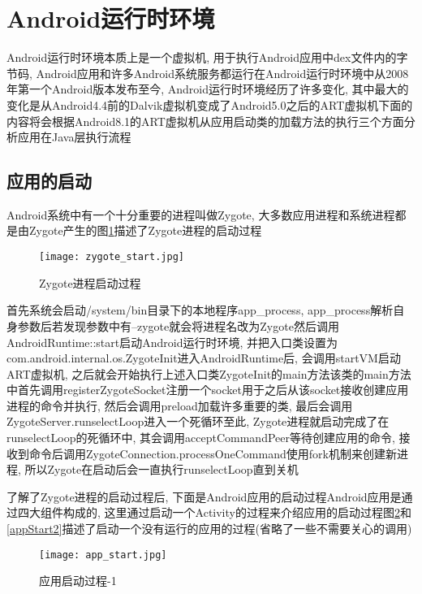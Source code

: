 \section{Android运行时环境}
\label{androidRuntime}
Android运行时环境本质上是一个虚拟机, 用于执行Android应用中dex文件内的字节码, Android应用和许多Android系统服务都运行在Android运行时环境中\juhao 从2008年第一个Android版本发布至今, Android运行时环境经历了许多变化, 其中最大的变化是从Android4.4前的Dalvik虚拟机变成了Android5.0之后的ART虚拟机\juhao 下面的内容将会根据Android8.1的ART虚拟机从应用启动\dunhao 类的加载\dunhao 方法的执行\dunhao 三个方面分析应用在Java层执行流程\juhao

\subsection{应用的启动}
\label{appStartA}
Android系统中有一个十分重要的进程叫做Zygote, 大多数应用进程和系统进程都是由Zygote产生的\juhao 图\ref{zygoteStart}描述了Zygote进程的启动过程\juhao
\begin{figure}[ht]
	\centering
	\texttt{[image: zygote\_start.jpg]}
	\caption{Zygote进程启动过程}
	\label{zygoteStart}
\end{figure}

首先系统会启动/system/bin目录下的本地程序app\_process, app\_process解析自身参数后若发现参数中有--zygote就会将进程名改为Zygote然后调用AndroidRuntime::start启动Android运行时环境, 并把入口类设置为com.android.internal.os.ZygoteInit\juhao 进入AndroidRuntime后, 会调用startVM启动ART虚拟机, 之后就会开始执行上述入口类ZygoteInit的main方法\juhao 该类的main方法中首先调用registerZygoteSocket注册一个socket用于之后从该socket接收创建应用进程的命令并执行, 然后会调用preload加载许多重要的类, 最后会调用ZygoteServer.runselectLoop进入一个死循环\juhao 至此, Zygote进程就启动完成了\juhao 在runselectLoop的死循环中, 其会调用acceptCommandPeer等待创建应用的命令, 接收到命令后调用ZygoteConnection.processOneCommand使用fork机制来创建新进程, 所以Zygote在启动后会一直执行runselectLoop直到关机\juhao

了解了Zygote进程的启动过程后, 下面是Android应用的启动过程\juhao Android应用是通过四大组件构成的, 这里通过启动一个Activity的过程来介绍应用的启动过程\juhao 图\ref{appStart}和\ref{appStart2}描述了启动一个没有运行的应用的过程(省略了一些不需要关心的调用)\juhao
\begin{figure}[ht]
	\centering
	\texttt{[image: app\_start.jpg]}
	\caption{应用启动过程-1}
	\label{appStart}
\end{figure}

